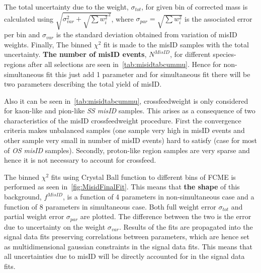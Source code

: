 The total uncertainty due to the weight, $\sigma_{tot}$, for given bin of corrected mass is calculated using $\sqrt{\sigma_{var}^2 +\sqrt{\sum{w^{2}_{i}}}^{2}}$, where $\sigma_{par}=\sqrt{\sum{w^{2}_{i}}}$ is the associated error per bin and $\sigma_{var}$ is the standard deviation obtained from variation of misID weights. Finally, The binned $\chi^{2}$ fit is made to the misID samples with the total uncertainty. \textbf{The number of misID events}, $N^{MisID}$, for different species-regions after all selections are seen in~\autoref{tab:misidtabcummu}. Hence for non-simultaneous fit this just add 1 parameter and for simultaneous fit there will be two parameters describing the total yield of misID.

Also it can be seen in~\autoref{tab:misidtabcummu}, crossfeedweight is only considered for kaon-like and pion-like \textit{SS misID} samples. This arises as a consequence of two characteristics of the misID crossfeedweight procedure. First the convergence criteria makes unbalanced samples (one sample very high in misID events and other sample very small in number of misID events) hard to satisfy (case for most of \textit{OS misID} samples). Secondly, proton-like region samples are very sparse and hence it is not necessary to account for crossfeed. %

The binned $\chi^{2}$ fits using Crystal Ball function to different bins of FCME is performed as seen in~\autoref{fig:MisidFinalFit}. This means that \textbf{the shape} of this background, $f^{MisID}$, is a function of 4 parameters in non-simultaneous case and a function of 8 parameters in simultaneous case. Both full weight error $\sigma_{tot}$ and partial weight error $\sigma_{par}$ are plotted. The difference between the two is the error due to uncertainty on the weight $\sigma_{var}$.  Results of the fits are propagated into the signal data fits preserving correlations between parameters, which are hence set as multidimensional gaussian constraints in the signal data fits. This means that all uncertainties due to misID will be directly accounted for in the signal data fits.


